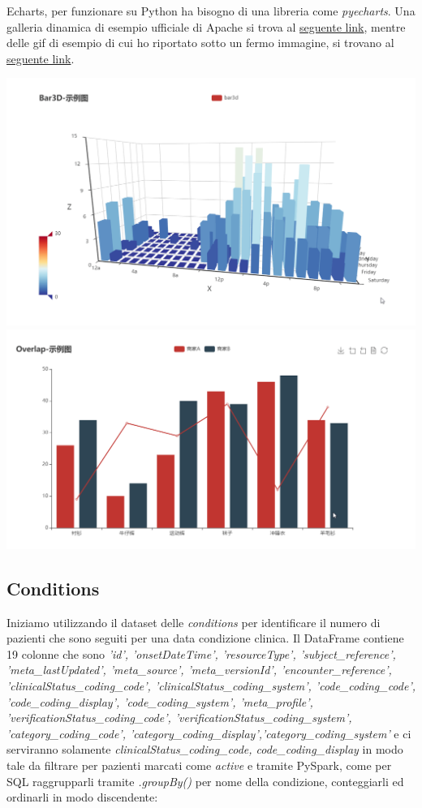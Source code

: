 \documentclass[11pt, oneside]{article}
\begin{document}
Echarts, per funzionare su Python ha bisogno di una libreria come \emph{pyecharts}. Una galleria dinamica di esempio ufficiale di Apache si trova al \href{https://echarts.apache.org/examples/en/index.html}{seguente link}, mentre delle gif di esempio di cui ho riportato sotto un fermo immagine, si trovano al \href{https://github.com/pyecharts/pyecharts#-demo}{seguente link}.

\begin{center}
\includegraphics[scale=0.3]{1_echarts_1.png}
\includegraphics[scale=0.3]{1_echarts_2.png}
\end{center}

\subsection{Conditions}

Iniziamo utilizzando il dataset delle \emph{conditions} per identificare il numero di pazienti che sono seguiti per una data condizione clinica. Il DataFrame contiene 19 colonne che sono \emph{'id', 'onsetDateTime', 'resourceType', 'subject\_reference', 'meta\_lastUpdated', 'meta\_source', 'meta\_versionId', 'encounter\_reference', 'clinicalStatus\_coding\_code', 'clinicalStatus\_coding\_system', 'code\_coding\_code', 'code\_coding\_display', 'code\_coding\_system', 'meta\_profile', 'verificationStatus\_coding\_code', 'verificationStatus\_coding\_system', 'category\_coding\_code', 'category\_coding\_display','category\_coding\_system'} e ci serviranno solamente \emph{clinicalStatus\_coding\_code, code\_coding\_display} in modo tale da filtrare per pazienti marcati come \emph{active} e tramite PySpark, come per SQL raggrupparli tramite \emph{.groupBy()} per nome della condizione, conteggiarli ed ordinarli in modo discendente:
\end{document}
